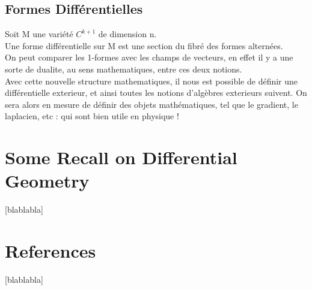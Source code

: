 \documentclass[a4paper,11pt]{article} %
\numberwithin{equation}{section} %
\numberwithin{figure}{section} %
\theoremstyle{plain} %
\theoremstyle{definition} %
\theoremstyle{remark} %
\begin{document}
\noindent

\subsection{Formes Diff\'erentielles}

\noindent
Soit M une vari\'et\'e $C^{k+1}$ de dimension n.\\
Une forme diff\'erentielle sur M est une section du fibr\'e des formes altern\'ees.\\

\noindent
On peut comparer les 1-formes avec les champs de vecteurs, en effet il y a une sorte de dualite, au sens mathematiques, entre ces deux notions.\\
Avec cette nouvelle structure mathematiques, il nous est possible de d\'efinir une diff\'erentielle exterieur, et ainsi toutes les notions d'alg\`ebres exterieurs suivent. On sera alors en mesure de d\'efinir des objets math\'ematiques, tel que le gradient, le laplacien, etc : qui sont bien utile en physique !


\section{Some Recall on Differential Geometry}

[blablabla]

\section{References}

[blablabla]
\end{document}
